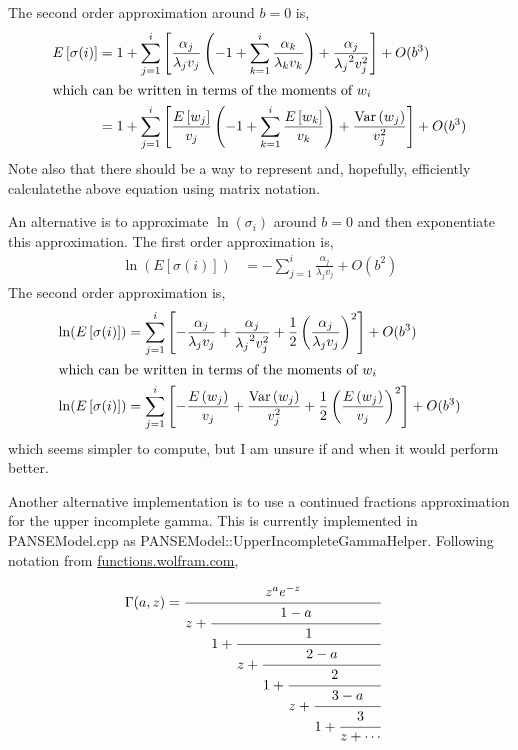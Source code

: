 \documentclass{article}
\newcommand{\elongWaitTime}{\ensuremath{w}\xspace}
\newcommand{\wi}{\ensuremath{\elongWaitTime_i}\xspace}
\newcommand{\wj}{\ensuremath{\elongWaitTime_j}\xspace}
\newcommand{\wk}{\ensuremath{\elongWaitTime_k}\xspace}
\newcommand{\alphaj}{\ensuremath{{\alpha_j}}\xspace}
\newcommand{\alphak}{\ensuremath{{\alpha_k}}\xspace}
\newcommand{\lambdaj}{\ensuremath{{\lambda_j}}\xspace}
\newcommand{\lambdak}{\ensuremath{{\lambda_k}}\xspace}
\newcommand{\nseWaitTime}{\ensuremath{v}\xspace}
\newcommand{\vj}{\ensuremath{\nseWaitTime_{j}}\xspace}
\newcommand{\vk}{\ensuremath{\nseWaitTime_{k}}\xspace}
\newcommand{\Esigmai}{\ensuremath{E\left[\sigma(i)\right]}\xspace}
\newcommand{\Var}{\ensuremath{\text{Var}}\xspace}
\begin{document}
The second order approximation around $b=0$ is,
\begin{align}
\label{eq:secondOrderApproxESigmag}
  \Esigmai &= 1 + \sum_{j=1}^i \left[\frac{\alphaj}{\lambdaj \vj} \left(-1+\sum_{k=1}^i\frac{\alphak}{\lambdak \vk} \right)+\frac{\alphaj}{\lambdaj^2 \vj^2}\right] +  O(b^3)\\
\intertext{which can be written in terms of the moments of \wi}
&= 1 + \sum_{j=1}^i \left[\frac{E\left[\wj\right]}{\vj} \left(-1+\sum_{k=1}^i\frac{E\left[\wk\right]}{ \vk} \right)+\frac{\Var\left(\wj\right)}{\vj^2}\right] +  O(b^3)
\end{align}
Note also that there should be a way to represent and, hopefully, efficiently calculatethe above equation using matrix notation.

An alternative is to approximate $\ln(\sigma_i)$ around $b=0$ and then exponentiate this approximation.
The first order approximation is,
\begin{align}
\ln(\Esigmai) &= - \sum_{j=1}^i \frac{\alphaj}{\lambdaj \vj} + O(b^2)
\end{align}
The second order approximation is,
\begin{align}
\ln(\Esigmai) &= \sum_{j=1}^i \left[-\frac{\alphaj}{\lambdaj \vj} + \frac{\alphaj}{\lambdaj^2 \vj^2} + \frac{1}{2} \left(\frac{\alphaj}{\lambdaj \vj}\right)^2\right]+ O(b^3)\\
\intertext{which can be written in terms of the moments of \wi}
\ln(\Esigmai) &= \sum_{j=1}^i \left[-\frac{E\left(\wj\right)}{\vj} + \frac{\Var\left(\wj\right)}{ \vj^2} + \frac{1}{2} \left(\frac{E\left(\wj\right)}{\vj}\right)^2\right]+ O(b^3)
\end{align}
which seems simpler to compute, but I am unsure if and when it would perform better.

Another alternative implementation is to use a continued fractions approximation for the upper incomplete gamma.
This is currently implemented in PANSEModel.cpp as PANSEModel::UpperIncompleteGammaHelper.
Following notation from \href{http://functions.wolfram.com/GammaBetaErf/Gamma2/10/}{functions.wolfram.com},

\begin{align}
\label{eq:continuedFraction}
\Gamma(a,z) &= \cfrac{z^ae^{-z}}{z + \cfrac{1 - a}{1 + \cfrac{1}{z + \cfrac{2 - a}{1 + \cfrac{2}{z+\cfrac{3 - a}{1 + \cfrac{3}{z + \cdots}}}}}}}
\end{align}
\end{document}
